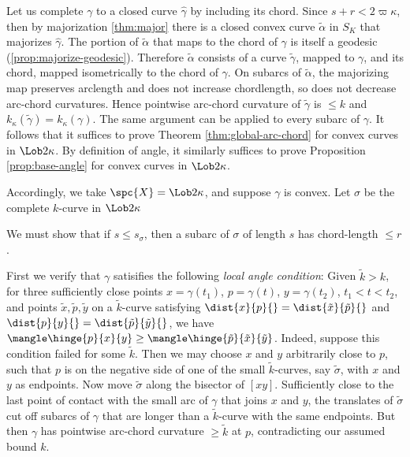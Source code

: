 Let us complete $\gamma$
to a closed curve $\hat\gamma$ by including its chord. Since $s+r<2\varpi\kappa$, then by 
majorization \ref{thm:major} there is a closed convex curve $\tilde\alpha$ in $S_K$ that
majorizes $\hat\gamma$. The portion of $\tilde\alpha$ that maps to the
chord of $\gamma$ is itself a  geodesic (\ref{prop:majorize-geodesic}).  Therefore
$\tilde\alpha$ consists of a curve $\tilde\gamma$, mapped to $\gamma$, and its
chord, mapped isometrically to the chord of $\gamma$. On subarcs of
$\tilde\alpha$, the majorizing map preserves arclength and does not increase chordlength, so does not decrease arc-chord
curvatures. Hence pointwise arc-chord curvature  of $\tilde\gamma$  is $\le k$  and  $k_{\kappa}(\tilde\gamma)= k_{\kappa}(\gamma)$. The same argument can be applied to every subarc of $\gamma$.
It follows that it suffices to prove Theorem \ref{thm:global-arc-chord} for convex curves in $\Lob2\kappa$.  
By definition of angle, it similarly suffices to prove  Proposition \ref{prop:base-angle} for convex curves in $\Lob2\kappa$.  

Accordingly, we take $\spc{X}=\Lob2\kappa$, and suppose  $\gamma$ is convex. Let $\sigma$ be the complete $k$-curve  in $\Lob2\kappa$

We must show that if $s\le s_\sigma$, then a subarc of $\sigma$ of length $s$ has chord-length $\le r$. 

First we verify that $\gamma$ satisifies  the following \emph{local angle condition}: 
Given $\tilde k> k$,
for three sufficiently close
points $x=\gamma (t_1)$, $p=\gamma (t)$, $y=\gamma(t_2)$, $t_1<t<t_2$,  and points $\tilde x, \tilde p, \tilde y$ on a $\tilde k$-curve satisfying 
$\dist{x}{p}{}=
\dist{\tilde x}{\tilde  p}{}$ and $\dist{p}{y}{}=
\dist{\tilde p}{\tilde  y}{}$, we have $\mangle\hinge{p}{x}{y}\ge \mangle\hinge{\tilde p}{\tilde x}{\tilde y}$. 
%
%
Indeed, suppose this condition failed for some $\tilde k$. Then we may choose $x$ and $y$ arbitrarily close to $p$, such that $p$ is on the negative side of one of the small $\tilde k$-curves, say $\tilde \sigma$, with $x$ and $y$ as endpoints. 
Now move $\tilde\sigma$  along the bisector of $[xy]$. Sufficiently close to the last point of contact with the small arc of $\gamma$ that joins $x$ and $y$,  the translates of $\tilde\sigma$ cut off subarcs  of $\gamma$ that are longer than a $ \tilde k$-curve with the same endpoints.  But then $\gamma$ has pointwise arc-chord curvature $\ge \tilde k$ at $p$, contradicting our assumed bound $k$.

